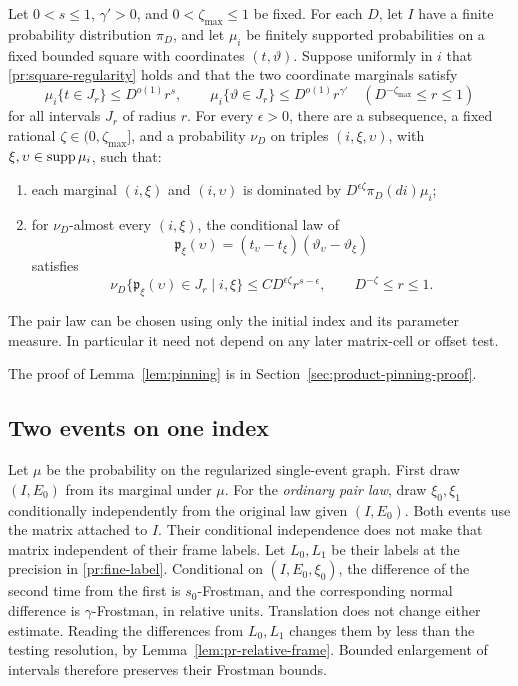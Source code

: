 \begin{lemma}
\label{lem:pinning}
Let $0<s\le1$, $\gamma'>0$, and $0<\zeta_{\max}\le1$ be fixed.
For each $D$, let $I$ have a finite probability distribution $\pi_D$,
and let $\mu_i$ be finitely supported probabilities on a fixed
bounded square with coordinates $(t,\vartheta)$.
Suppose uniformly in $i$ that \eqref{pr:square-regularity} holds and
that the two coordinate marginals satisfy
\begin{equation}
 \mu_i\{t\in J_r\}\le D^{o(1)}r^s,
 \qquad
 \mu_i\{\vartheta\in J_r\}\le D^{o(1)}r^{\gamma'}
 \quad(D^{-\zeta_{\max}}\le r\le1)
\label{pr:coordinate-frostman}
\end{equation}
for all intervals $J_r$ of radius $r$.
For every $\epsilon>0$, there are a subsequence, a fixed rational
$\zeta\in(0,\zeta_{\max}]$, and a probability $\nu_D$ on triples
$(i,\xi,\upsilon)$, with $\xi,\upsilon\in\operatorname{supp}\mu_i$, such that:
\begin{enumerate}[label=\textup{(\roman*)}]
\item each marginal $(i,\xi)$ and $(i,\upsilon)$ is dominated by
$D^{\epsilon\zeta}\pi_D(di)\mu_i$;
\item for $\nu_D$-almost every $(i,\xi)$, the conditional law of
\[
 \mathfrak p_\xi(\upsilon)
   =(t_\upsilon-t_\xi)(\vartheta_\upsilon-\vartheta_\xi)
\]
satisfies
\begin{equation}
 \nu_D\{\mathfrak p_\xi(\upsilon)\in J_r\mid i,\xi\}
 \le C D^{\epsilon\zeta}r^{s-\epsilon},
 \qquad D^{-\zeta}\le r\le1.
\label{pr:pinned-frostman}
\end{equation}
\end{enumerate}
The pair law can be chosen using only the initial index and its
parameter measure. In particular it need not depend on any later
matrix-cell or offset test.
\end{lemma}

The proof of Lemma~\ref{lem:pinning} is in
Section~\ref{sec:product-pinning-proof}.

\subsection{Two events on one index}

Let $\mu$ be the probability on the regularized single-event graph.
First draw $(I,E_0)$ from its marginal under $\mu$. For the
\emph{ordinary pair law}, draw $\xi_0,\xi_1$ conditionally
independently from the original law given $(I,E_0)$. Both events use
the matrix attached to $I$. Their conditional independence does not
make that matrix independent of their frame labels.
Let $L_0,L_1$ be their labels at the precision in
\eqref{pr:fine-label}.
Conditional on $(I,E_0,\xi_0)$, the difference of the second time
from the first is $s_0$-Frostman, and the corresponding normal
difference is $\gamma$-Frostman, in relative units. Translation
does not change either estimate. Reading the differences from
$L_0,L_1$ changes them by less than the testing resolution, by
Lemma~\ref{lem:pr-relative-frame}. Bounded enlargement of intervals
therefore preserves their Frostman bounds.

